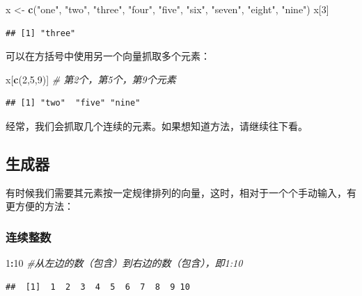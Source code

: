 \documentclass[]{book}
\newenvironment{Shaded}{\begin{snugshade}}{\end{snugshade}}
\newcommand{\CommentTok}[1]{\textcolor[rgb]{0.56,0.35,0.01}{\textit{#1}}}
\newcommand{\DecValTok}[1]{\textcolor[rgb]{0.00,0.00,0.81}{#1}}
\newcommand{\KeywordTok}[1]{\textcolor[rgb]{0.13,0.29,0.53}{\textbf{#1}}}
\newcommand{\NormalTok}[1]{#1}
\newcommand{\OperatorTok}[1]{\textcolor[rgb]{0.81,0.36,0.00}{\textbf{#1}}}
\newcommand{\StringTok}[1]{\textcolor[rgb]{0.31,0.60,0.02}{#1}}
\begin{document}
\begin{Shaded}
\begin{Highlighting}[]
\NormalTok{x <-}\StringTok{ }\KeywordTok{c}\NormalTok{(}\StringTok{"one"}\NormalTok{, }\StringTok{"two"}\NormalTok{, }\StringTok{"three"}\NormalTok{, }\StringTok{"four"}\NormalTok{, }\StringTok{"five"}\NormalTok{, }\StringTok{"six"}\NormalTok{, }\StringTok{"seven"}\NormalTok{, }\StringTok{"eight"}\NormalTok{, }\StringTok{"nine"}\NormalTok{)}
\NormalTok{x[}\DecValTok{3}\NormalTok{]}
\end{Highlighting}
\end{Shaded}

\begin{verbatim}
## [1] "three"
\end{verbatim}

可以在方括号中使用另一个向量抓取多个元素：

\begin{Shaded}
\begin{Highlighting}[]
\NormalTok{x[}\KeywordTok{c}\NormalTok{(}\DecValTok{2}\NormalTok{,}\DecValTok{5}\NormalTok{,}\DecValTok{9}\NormalTok{)] }\CommentTok{# 第2个，第5个，第9个元素}
\end{Highlighting}
\end{Shaded}

\begin{verbatim}
## [1] "two"  "five" "nine"
\end{verbatim}

经常，我们会抓取几个连续的元素。如果想知道方法，请继续往下看。

\subsection{生成器}

有时候我们需要其元素按一定规律排列的向量，这时，相对于一个个手动输入，有更方便的方法：

\subsubsection{连续整数}

\begin{Shaded}
\begin{Highlighting}[]
\DecValTok{1}\OperatorTok{:}\DecValTok{10} \CommentTok{#从左边的数（包含）到右边的数（包含），即1:10}
\end{Highlighting}
\end{Shaded}

\begin{verbatim}
##  [1]  1  2  3  4  5  6  7  8  9 10
\end{verbatim}
\end{document}
